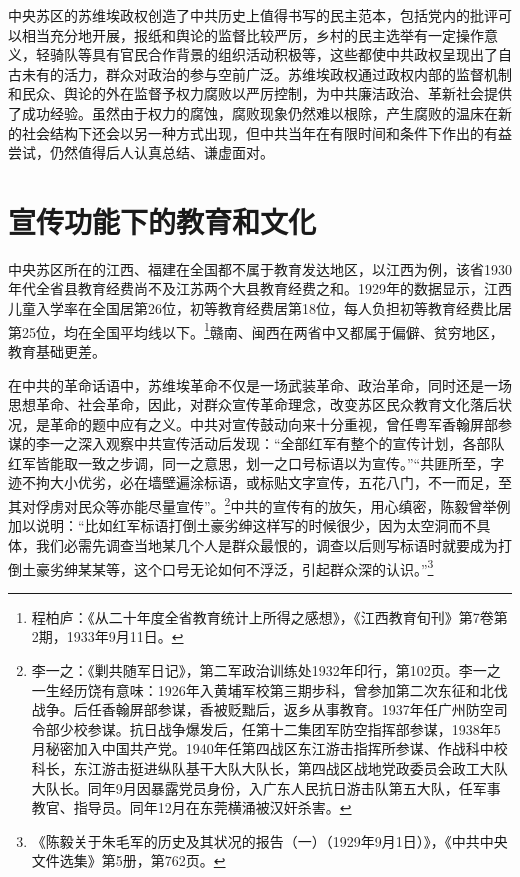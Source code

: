 中央苏区的苏维埃政权创造了中共历史上值得书写的民主范本，包括党内的批评可以相当充分地开展，报纸和舆论的监督比较严厉，乡村的民主选举有一定操作意义，轻骑队等具有官民合作背景的组织活动积极等，这些都使中共政权呈现出了自古未有的活力，群众对政治的参与空前广泛。苏维埃政权通过政权内部的监督机制和民众、舆论的外在监督予权力腐败以严厉控制，为中共廉洁政治、革新社会提供了成功经验。虽然由于权力的腐蚀，腐败现象仍然难以根除，产生腐败的温床在新的社会结构下还会以另一种方式出现，但中共当年在有限时间和条件下作出的有益尝试，仍然值得后人认真总结、谦虚面对。

\section{宣传功能下的教育和文化}


中央苏区所在的江西、福建在全国都不属于教育发达地区，以江西为例，该省1930年代全省县教育经费尚不及江苏两个大县教育经费之和。1929年的数据显示，江西儿童入学率在全国居第26位，初等教育经费居第18位，每人负担初等教育经费比居第25位，均在全国平均线以下。\footnote{程柏庐：《从二十年度全省教育统计上所得之感想》，《江西教育旬刊》第7卷第2期，1933年9月11日。}赣南、闽西在两省中又都属于偏僻、贫穷地区，教育基础更差。


在中共的革命话语中，苏维埃革命不仅是一场武装革命、政治革命，同时还是一场思想革命、社会革命，因此，对群众宣传革命理念，改变苏区民众教育文化落后状况，是革命的题中应有之义。中共对宣传鼓动向来十分重视，曾任粤军香翰屏部参谋的李一之深入观察中共宣传活动后发现：“全部红军有整个的宣传计划，各部队红军皆能取一致之步调，同一之意思，划一之口号标语以为宣传。”“共匪所至，字迹不拘大小优劣，必在墙壁遍涂标语，或标贴文字宣传，五花八门，不一而足，至其对俘虏对民众等亦能尽量宣传”。\footnote{李一之：《剿共随军日记》，第二军政治训练处1932年印行，第102页。李一之一生经历饶有意味：1926年入黄埔军校第三期步科，曾参加第二次东征和北伐战争。后任香翰屏部参谋，香被贬黜后，返乡从事教育。1937年任广州防空司令部少校参谋。抗日战争爆发后，任第十二集团军防空指挥部参谋，1938年5月秘密加入中国共产党。1940年任第四战区东江游击指挥所参谋、作战科中校科长，东江游击挺进纵队基干大队大队长，第四战区战地党政委员会政工大队大队长。同年9月因暴露党员身份，入广东人民抗日游击队第五大队，任军事教官、指导员。同年12月在东莞横涌被汉奸杀害。}中共的宣传有的放矢，用心缜密，陈毅曾举例加以说明：“比如红军标语打倒土豪劣绅这样写的时候很少，因为太空洞而不具体，我们必需先调查当地某几个人是群众最恨的，调查以后则写标语时就要成为打倒土豪劣绅某某等，这个口号无论如何不浮泛，引起群众深的认识。”\footnote{《陈毅关于朱毛军的历史及其状况的报告（一）（1929年9月1日）》，《中共中央文件选集》第5册，第762页。}


